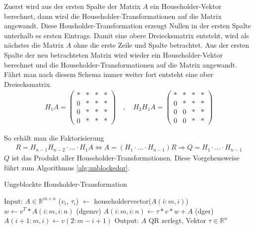 Zuerst wird aus der ersten Spalte der Matrix $A$ ein Householder-Vektor berechnet, dann wird die  Householder-Transformationen auf die Matrix angewandt.
Diese Housholder-Transformation erzeugt Nullen in der ersten Spalte unterhalb es ersten Eintrags.
Damit eine obere Dreiecksmatrix entsteht, wird als nächstes die Matrix $A$ ohne die erste Zeile und Spalte betrachtet. Aus der ersten Spalte der neu betrachteten Matrix wird wieder ein Householder-Vektor berechnet und die Householder-Transformationen auf die Matrix angewandt.
Fährt man nach diesem Schema immer weiter fort entsteht eine ober Dreiecksmatrix.
\begin{align*}
	H_1 A= \left( 
	\begin{array}{cccc}
	* & * & * & * \\ 
	0 & * & * & * \\ 
	0 & * & * & * \\ 
	0 & * & * & *
	\end{array}
	\right)
	\quad , \quad
	H_2 H_1 A= \left( 
	\begin{array}{cccc}
	* & * & * & * \\ 
	0 & * & * & * \\ 
	0 & 0 & * & * \\ 
	0 & 0 & * & *
	\end{array}
	\right)
\end{align*} 





So erhält man die Faktorisierung
\begin{align*}
R = H_{n-1} H_{n-2}\cdot ...\cdot H_1 A \Leftrightarrow A = (H_1\cdot ...\cdot H_{n-1})R \Rightarrow Q = H_1\cdot ... \cdot H_{n-1}
\end{align*}
$Q$ ist das Produkt aller Householder-Transformationen.
Diese Vorgehensweise führt zum Algorithmus \ref{alg:unblockedqr}. 
\begin{algorithm}[H]
	\caption{Ungeblockte Housholder-Transformation}
	\begin{algorithmic}
	\State Input: $A \in \mathbb{R}^{m \times n}$
		\State ($v_i$, $\tau_i$) $\leftarrow$ householdervector($A(i:m,i)$)
		\State $w \leftarrow v^T*A(i:m,i:n)$ (dgemv)
		\State $ A(i:m,i:n) \leftarrow \tau * v * w + A $ (dger)
			\State $A(i + 1 : m, i) \leftarrow v(2 : m - i + 1)$
		\EndIf
	\EndFor	
	\State Output: $A$ QR zerlegt, Vektor $\tau \in \mathbb{R}^n$
\end{algorithmic} 
\label{alg:unblockedqr}
\end{algorithm}

